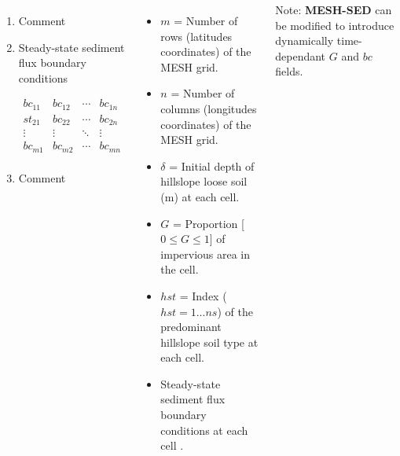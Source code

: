 \documentclass{beamer}
\newcommand{\ms}{\textbf{MESH-SED} }
\newcounter{ResumeEnumerate}
\begin{document}
\begin{frame}
\begin{columns}
{\begin{enumerate}[label=Line \arabic*]
\begin{minipage}[t]{0.1\linewidth}
\begin{flushright}
$$\begin{matrix}
hst_{21} & hst_{22} & \cdots & hst_{2n} \\
\vdots & \vdots & \ddots & \vdots \\
hst_{m1} & hst_{m2} & \cdots & hst_{mn}\\
\end{matrix}
$$
\end{flushright}
\end{minipage}
\item Comment
\item Steady-state sediment flux boundary conditions\\[-2.7em]
\begin{minipage}[t]{0.1\linewidth}
\begin{flushright}
$$
\begin{matrix} 
bc_{11} & bc_{12} & \cdots & bc_{1n} \\
st_{21} & bc_{22} & \cdots & bc_{2n} \\
\vdots & \vdots & \ddots & \vdots \\
bc_{m1} & bc_{m2} & \cdots & bc_{mn}\\
\end{matrix}
$$
\end{flushright}
\end{minipage}
\item Comment
\end{enumerate}
\setcounter{ResumeEnumerate}{\value{enumi}}
}
{\scriptsize 
\begin{itemize}[label={}]
\item $m$ = Number of rows (latitudes coordinates) of the MESH grid.
\item $n$ = Number of columns (longitudes coordinates) of the MESH grid.
\item $\delta$ = Initial depth of hillslope loose soil (m) at each cell.
\item $G$ =  Proportion [$0\leq G \leq 1$] of impervious area in the cell.
\item $hst$ =  Index ($hst = 1 ... ns$) of the predominant hillslope soil type at each cell.
\item Steady-state sediment flux boundary conditions at each cell . 
\end{itemize}
Note: \ms can be modified to introduce dynamically time-dependant $G$ and $bc$ fields.
}
\end{columns}
\end{frame}
\end{document}
